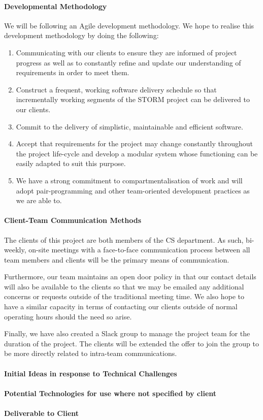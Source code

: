 \documentclass[12pt]{article}
\begin{document}
\paragraph{Developmental Methodology}
We will be following an Agile development methodology. We hope to realise this development methodology by doing the following:
\begin{enumerate}
\item Communicating with our clients to ensure they are informed of project progress as well as to constantly refine and update our understanding of requirements in order to meet them.
\item Construct a frequent, working software delivery schedule so that incrementally working segments of the STORM project can be delivered to our clients.
\item Commit to the delivery of simplistic, maintainable and efficient software.
\item Accept that requirements for the project may change constantly throughout the project life-cycle and develop a modular system whose functioning can be easily adapted to suit this purpose.
\item We have a strong commitment to compartmentalisation of work and will adopt pair-programming and other team-oriented development practices as we are able to.
\end{enumerate}

\paragraph{Client-Team Communication Methods}
The clients of this project are both members of the CS department. As such, bi-weekly, on-site meetings with a face-to-face communication process between all team members and clients will be the primary means of communication.

Furthermore, our team maintains an open door policy in that our contact details will also be available to the clients so that we may be emailed any additional concerns or requests outside of the traditional meeting time. We also hope to have a similar capacity in terms of contacting our clients outside of normal operating hours should the need so arise.

Finally, we have also created a Slack group to manage the project team for the duration of the project. The clients will be extended the offer to join the group to be more directly related to intra-team communications.
\paragraph{Initial Ideas in response to Technical Challenges}
\paragraph{Potential Technologies for use where not specified by client}
\paragraph{Deliverable to Client}
\end{document}
